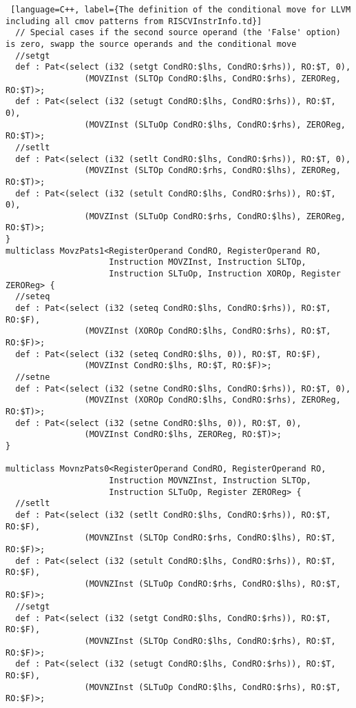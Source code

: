 \documentclass[12pt,twoside,notitlepage]{report}
\begin{document}
\begin{lstlisting} [language=C++, label={The definition of the conditional move for LLVM including all cmov patterns from RISCVInstrInfo.td}]
  // Special cases if the second source operand (the 'False' option) is zero, swapp the source operands and the conditional move
  //setgt
  def : Pat<(select (i32 (setgt CondRO:$lhs, CondRO:$rhs)), RO:$T, 0),
                (MOVZInst (SLTOp CondRO:$lhs, CondRO:$rhs), ZEROReg, RO:$T)>;
  def : Pat<(select (i32 (setugt CondRO:$lhs, CondRO:$rhs)), RO:$T, 0),
                (MOVZInst (SLTuOp CondRO:$lhs, CondRO:$rhs), ZEROReg, RO:$T)>; 
  //setlt
  def : Pat<(select (i32 (setlt CondRO:$lhs, CondRO:$rhs)), RO:$T, 0),
                (MOVZInst (SLTOp CondRO:$rhs, CondRO:$lhs), ZEROReg, RO:$T)>;
  def : Pat<(select (i32 (setult CondRO:$lhs, CondRO:$rhs)), RO:$T, 0),
                (MOVZInst (SLTuOp CondRO:$rhs, CondRO:$lhs), ZEROReg, RO:$T)>; 
}
multiclass MovzPats1<RegisterOperand CondRO, RegisterOperand RO,
                     Instruction MOVZInst, Instruction SLTOp,
                     Instruction SLTuOp, Instruction XOROp, Register ZEROReg> {
  //seteq
  def : Pat<(select (i32 (seteq CondRO:$lhs, CondRO:$rhs)), RO:$T, RO:$F),
				(MOVZInst (XOROp CondRO:$lhs, CondRO:$rhs), RO:$T, RO:$F)>; 
  def : Pat<(select (i32 (seteq CondRO:$lhs, 0)), RO:$T, RO:$F),
				(MOVZInst CondRO:$lhs, RO:$T, RO:$F)>; 
  //setne
  def : Pat<(select (i32 (setne CondRO:$lhs, CondRO:$rhs)), RO:$T, 0),
  				(MOVZInst (XOROp CondRO:$lhs, CondRO:$rhs), ZEROReg, RO:$T)>; 
  def : Pat<(select (i32 (setne CondRO:$lhs, 0)), RO:$T, 0),
				(MOVZInst CondRO:$lhs, ZEROReg, RO:$T)>;
}

multiclass MovnzPats0<RegisterOperand CondRO, RegisterOperand RO,
                     Instruction MOVNZInst, Instruction SLTOp,
                     Instruction SLTuOp, Register ZEROReg> {
  //setlt
  def : Pat<(select (i32 (setlt CondRO:$lhs, CondRO:$rhs)), RO:$T, RO:$F),
                (MOVNZInst (SLTOp CondRO:$rhs, CondRO:$lhs), RO:$T, RO:$F)>;
  def : Pat<(select (i32 (setult CondRO:$lhs, CondRO:$rhs)), RO:$T, RO:$F),
                (MOVNZInst (SLTuOp CondRO:$rhs, CondRO:$lhs), RO:$T, RO:$F)>;             
  //setgt                              
  def : Pat<(select (i32 (setgt CondRO:$lhs, CondRO:$rhs)), RO:$T, RO:$F),
                (MOVNZInst (SLTOp CondRO:$lhs, CondRO:$rhs), RO:$T, RO:$F)>;
  def : Pat<(select (i32 (setugt CondRO:$lhs, CondRO:$rhs)), RO:$T, RO:$F),
                (MOVNZInst (SLTuOp CondRO:$lhs, CondRO:$rhs), RO:$T, RO:$F)>;               
		

\end{lstlisting}
\end{document}
